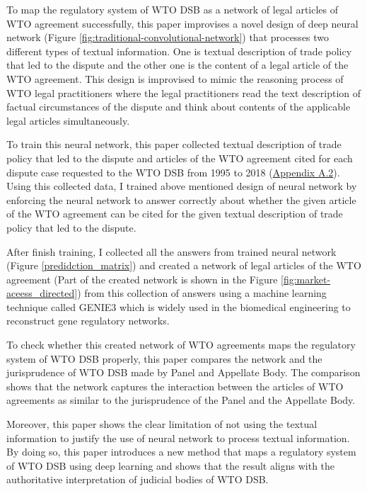 To map the regulatory system of WTO DSB as 
a network of legal articles of WTO agreement 
successfully,
this paper improvises 
a novel design of deep neural network (Figure \ref{fig:traditional-convolutional-network}) that
processes two different types of textual information.
One is textual description of trade policy that led to the dispute and
the other one is the content of a legal article of the WTO agreement.
This design is improvised to mimic
the reasoning process of WTO legal practitioners
where the legal practitioners read
the text description of
factual circumstances of the dispute and think about contents of
the applicable legal articles simultaneously.


To train this neural network, this paper collected textual description of trade policy 
that led to the dispute and articles of the WTO agreement cited for each dispute
case requested to the WTO DSB 
from 1995 to 2018 (\hyperref[sub:cited-articles-table]{Appendix A.2}).
Using this collected data, I trained above mentioned design of neural network by enforcing the neural network to answer correctly 
about whether the given article of the WTO agreement
can be cited for the given textual description of 
trade policy that led to the dispute.

After finish training, I collected all the answers from trained neural network (Figure \ref{predidction_matrix})
and created a network of legal articles of the WTO agreement (Part of the created network is shown in the Figure \ref{fig:market-aceess_directed}) 
from this collection of answers using a machine learning technique called GENIE3 \citep{genie3} 
which is widely used in the biomedical engineering to reconstruct gene regulatory networks.

To check whether this created network of WTO agreements maps the regulatory system of WTO DSB properly, this paper
compares the network and the jurisprudence of WTO DSB made by Panel and Appellate Body. 
The comparison shows that the network captures the interaction between the articles of WTO agreements
as similar to the jurisprudence of the Panel and the Appellate Body.

Moreover, this paper shows the clear limitation of not using the textual information 
to justify the use of neural network to process textual information. By doing so, this paper introduces a new method 
that maps a regulatory system of WTO DSB using 
deep learning and shows that the result aligns with the
authoritative interpretation of judicial bodies of WTO DSB.



